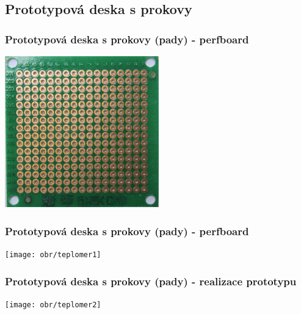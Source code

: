 \documentclass{beamer}
\begin{document}
\subsection{\texorpdfstring{Prototypová deska s prokovy}{Prototypová deska s prokovy}}
  \begin{frame}
    \frametitle{Prototypová deska s prokovy (pady) - perfboard}
    \begin{center}
      \includegraphics[width=0.5\textwidth]{obr/perfBoard_bot.png}
    \end{center}
  \end{frame}
  \begin{frame}
    \frametitle{Prototypová deska s prokovy (pady) - perfboard}
    \begin{center}
      \texttt{[image: obr/teplomer1]}
    \end{center}
  \end{frame}
  \begin{frame}
    \frametitle{Prototypová deska s prokovy (pady) - realizace prototypu}
    \begin{center}
      \texttt{[image: obr/teplomer2]}
    \end{center}
  \end{frame}
\end{document}
